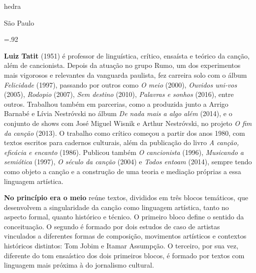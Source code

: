               \newfontfamily{}
              {\fontsize{30}{40}\selectfont \timesnewroman hedra}
              
              \medskip

              {\selectfont\minion\small
              São Paulo \quad\the\year}
\endgroup
\pagebreak

\begingroup 

\footnotesize\parindent0pt\parskip5pt\thispagestyle{empty} 
\vspace*{.1\textheight}\mbox{} \vfill
\baselineskip=.92\baselineskip
\thispagestyle{empty}

\textbf{Luiz Tatit} (1951) é professor de linguística, crítico, ensaísta e teórico da canção, além de cancionista. Depois da atuação no grupo Rumo, um dos experimentos mais vigorosos e relevantes da vanguarda paulista, fez carreira solo com o álbum \textit{Felicidade} (1997), passando por outros como \textit{O meio} (2000), \textit{Ouvidos uni-vos} (2005), \textit{Rodopio} (2007), \textit{Sem destino} (2010), \textit{Palavras e sonhos} (2016), entre outros. Trabalhou também em parcerias, como a produzida junto a Arrigo Barnabé e Lívia Nestróvski no álbum \textit{De nada mais a algo além} (2014), e o conjunto de shows com José Miguel Wisnik e Arthur Nestróvski, no projeto \textit{O fim da canção} (2013). O trabalho como crítico começou a partir dos anos 1980, com textos escritos para cadernos culturais, além da publicação do livro \textit{A canção, eficácia e encanto} (1986). Publicou também \textit{O cancionista} (1996), \textit{Musicando a semiótica} (1997), \textit{O século da canção} (2004) e \textit{Todos entoam} (2014), sempre tendo como objeto a canção e a construção de uma teoria e mediação próprias a essa linguagem artística.

\textbf{No princípio era o meio} reúne textos, divididos em três blocos temáticos, que desenvolvem a singularidade da canção como linguagem artística, tanto no aspecto formal, quanto histórico e técnico. O primeiro bloco define o sentido da conceituação. O segundo é formado por dois estudos de caso de artistas vinculados a diferentes formas de composição, movimentos artísticos e contextos históricos distintos: Tom Jobim e Itamar Assumpção. O terceiro, por sua vez, diferente do tom ensaístico dos dois primeiros blocos, é formado por textos com linguagem mais próxima à do jornalismo cultural.

